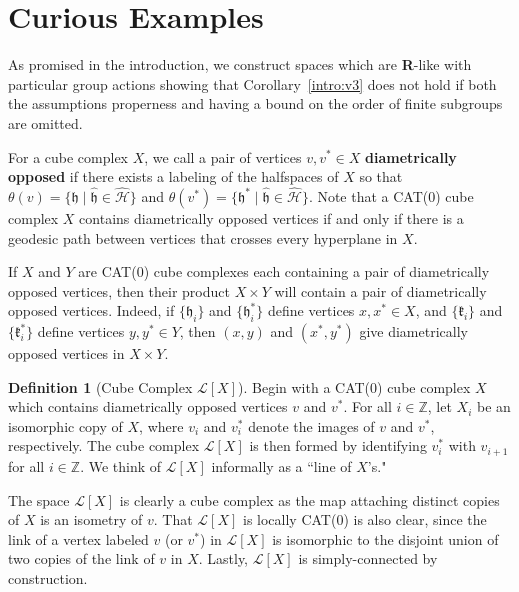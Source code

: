 \documentclass{amsart}
\theoremstyle{definition}
\newtheorem{definition}[theorem]{Definition}
\newtheorem*{Notation warning}{Warning on notations}
\newtheorem*{Sketch of proof}{Sketch of proof for Theorem C}
\newcommand{\h}{{\mathfrak h}}
\begin{document}
\begin{sloppypar}
\section{Curious Examples}\label{section:counterexample}


As promised in the introduction, we construct spaces which are \textbf{R}-like with particular group actions showing that Corollary~\ref{intro:v3} does not hold if both the assumptions properness and having a bound on the order of finite subgroups are omitted.
\medskip

For a cube complex $X$, we call a pair of vertices $v,v^*\in X$ {\bf diametrically opposed} if there exists a labeling of the halfspaces of $X$ so that $\theta(v)=\{\h\;|\;\hat{\h}\in\hat{\mathcal{H}}\}$ and $\theta(v^*)=\{\h^*\;|\;\hat{\h}\in\hat{\mathcal{H}}\}$. Note that a CAT(0) cube complex $X$ contains diametrically opposed vertices if and only if there is a geodesic path between vertices that crosses every hyperplane in $X$.
\medskip

If $X$ and $Y$ are CAT(0) cube complexes each containing a pair of diametrically opposed vertices, then their product $X\times Y$ will contain a pair of diametrically opposed vertices. Indeed, if $\{\h_i\}$ and $\{\h_i^*\}$ define vertices $x,x^*\in X$, and $\{\mathfrak{k}_i\}$ and $\{\mathfrak{k}_i^*\}$ define vertices $y,y^*\in Y$, then $(x,y)$ and $(x^*,y^*)$ give diametrically opposed vertices in $X\times Y$.

\begin{definition}[Cube Complex $\mathcal{L}{[X]}$]
    Begin with a CAT(0) cube complex $X$ which contains diametrically opposed vertices $v$ and $v^*$. For all $i\in\mathbb{Z}$, let $X_i$ be an isomorphic copy of $X$, where $v_i$ and $v_i^*$ denote the images of $v$ and $v^*$, respectively. The cube complex $\mathcal{L}[X]$ is then formed by identifying $v_i^*$ with $v_{i+1}$ for all $i\in\mathbb{Z}$. We think of $\mathcal{L}[X]$ informally as a ``line of $X$'s."
\end{definition}
\medskip

The space $\mathcal{L}[X]$ is clearly a cube complex as the map attaching distinct copies of $X$ is an isometry of $v$. That $\mathcal{L}[X]$ is locally CAT(0) is also clear, since the link of a vertex labeled $v$ (or $v^*$) in $\mathcal{L}[X]$ is isomorphic to the disjoint union of two copies of the link of $v$ in $X$. Lastly, $\mathcal{L}[X]$ is simply-connected by construction.
\medskip


\end{sloppypar}
\end{document}
